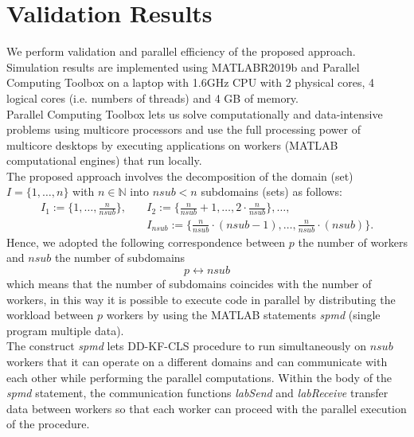 \documentclass{report}
\begin{document}
\section{Validation Results}


We perform  validation and parallel efficiency of the proposed  approach.\\ Simulation results are implemented using MATLABR2019b and 
Parallel Computing Toolbox on a laptop  with  1.6GHz CPU with 2 physical cores, 4 logical cores (i.e. numbers of threads) and 4 GB of memory.
\\
Parallel Computing Toolbox lets us solve computationally and data-intensive problems using multicore processors and use the full processing power of multicore desktops by executing applications on workers (MATLAB computational engines) that run locally.\\
\noindent The proposed approach involves the decomposition of the domain (set) $I=\{1,\ldots,n\}$ with $n\in \mathbb{N}$ into $nsub<n$ subdomains (sets) as follows:
\begin{displaymath}
\begin{split}
 I_ {1}:=\{1,\ldots,\frac{n}{nsub}\}, \quad  & I_ {2}:=\{\frac{n}{nsub}+1,\ldots,2\cdot \frac{n}{nsub}\}, \ldots,\\ & I_{nsub}:=\{\frac{n}{nsub}\cdot (nsub-1),\ldots,  \frac{n}{nsub}\cdot (nsub)\}.
 \end{split}
 \end{displaymath}
 Hence, we adopted the following correspondence between $p$ the number of workers and $nsub$ the number of subdomains
 \begin{displaymath}
 p\leftrightarrow nsub
 \end{displaymath}
 which means that the number of subdomains coincides with the number of workers, in this way it is possible to execute code in parallel by distributing the workload between $p$ workers by using the MATLAB statements \textit{spmd} (single program multiple data).\\ The construct \textit{spmd} lets DD-KF-CLS procedure to run simultaneously on $nsub$ workers that it can operate on a different domains and can communicate with each other while performing the parallel computations. Within the body of the \textit{spmd} statement, the communication functions \textit{labSend} and \textit{labReceive} transfer data between workers so that each worker can proceed with the parallel execution of the procedure.
\\
\end{document}
